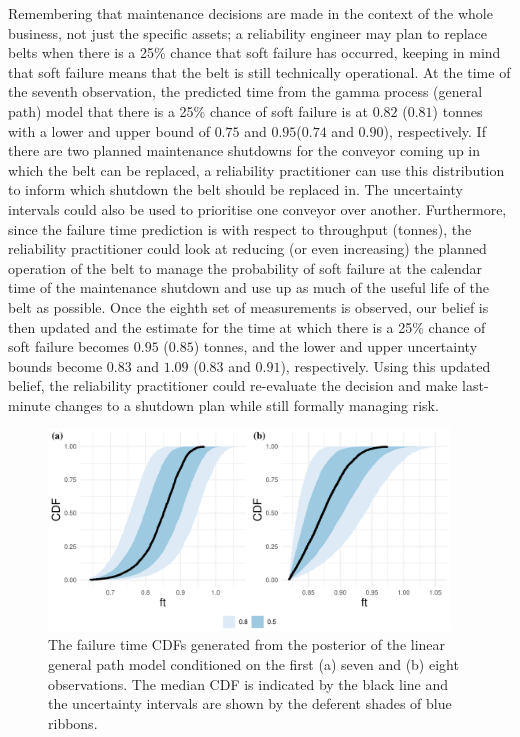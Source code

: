 Remembering that maintenance decisions are made in the context of the whole business, not just the specific assets; a reliability engineer may plan to replace belts when there is a 25\% chance that soft failure has occurred, keeping in mind that soft failure means that the belt is still technically operational. At the time of the seventh observation, the predicted time from the gamma process (general path) model that there is a 25\% chance of soft failure is at $0.82$ ($0.81$) tonnes with a lower and upper bound of $0.75$ and $0.95$($0.74$ and $0.90$), respectively. If there are two planned maintenance shutdowns for the conveyor coming up in which the belt can be replaced, a reliability practitioner can use this distribution to inform which shutdown the belt should be replaced in. The uncertainty intervals could also be used to prioritise one conveyor over another. Furthermore, since the failure time prediction is with respect to throughput (tonnes), the reliability practitioner could look at reducing (or even increasing) the planned operation of the belt to manage the probability of soft failure at the calendar time of the maintenance shutdown and use up as much of the useful life of the belt as possible. Once the eighth set of measurements is observed, our belief is then updated and the estimate for the time at which there is a 25\% chance of soft failure becomes $0.95$ ($0.85$) tonnes, and the lower and upper uncertainty bounds become $0.83$ and $1.09$ ($0.83$ and $0.91$), respectively. Using this updated belief, the reliability practitioner could re-evaluate the decision and make last-minute changes to a shutdown plan while still formally managing risk.

\begin{figure}[tbp]
  \centering
  \includegraphics[width=0.95\textwidth]{figures/ch-6/belt_wear_failuretime_CDF_lm.pdf}
  \caption{The failure time CDFs generated from the posterior of the linear general path model conditioned on the first (a) seven and (b) eight observations. The median CDF is indicated by the black line and the uncertainty intervals are shown by the deferent shades of blue ribbons.}
  \label{fig:beltwear-ft-lm}
\end{figure}

